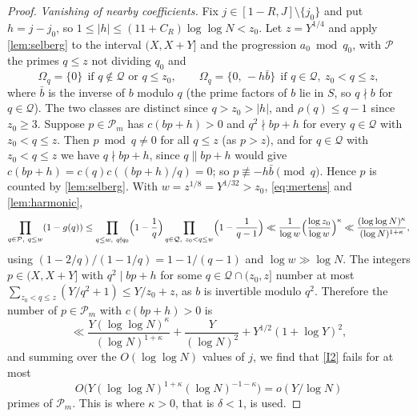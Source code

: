 \documentclass[11pt]{article}
\newcommand{\Qset}{\mathcal Q}
\newcommand{\Pset}{\mathcal P}
\begin{document}
\begin{proof}
\emph{Vanishing of nearby coefficients.} Fix $j\in[1-R,J]\setminus\{j_0\}$
and put $h=j-j_0$, so $1\le|h|\le(11+C_R)\log\log N<z_0$. Let $z=Y^{1/4}$ and
apply \cref{lem:selberg} to the interval $(X,X+Y]$ and the progression
$a_0\bmod q_0$, with $\Pset$ the primes $q\le z$ not dividing $q_0$ and
\[
\Omega_q=\{0\}\ \ \text{if }q\notin\Qset\text{ or }q\le z_0,\qquad
\Omega_q=\{0,\,-h\bar b\}\ \ \text{if }q\in\Qset,\ z_0<q\le z,
\]
where $\bar b$ is the inverse of $b$ modulo $q$ (the prime factors of $b$ lie in
$S$, so $q\nmid b$ for $q\in\Qset$). The two classes are distinct since
$q>z_0>|h|$, and $\rho(q)\le q-1$ since $z_0\ge3$. Suppose $p\in\Pset_m$ has
$c(bp+h)>0$ and $q^2\nmid bp+h$ for every $q\in\Qset$ with $z_0<q\le z$. Then
$p\bmod q\ne0$ for all $q\le z$ (as $p>z$), and for $q\in\Qset$ with
$z_0<q\le z$ we have $q\nmid bp+h$, since $q\parallel bp+h$ would give
$c(bp+h)=c(q)c((bp+h)/q)=0$; so $p\not\equiv-h\bar b\pmod q$. Hence $p$ is
counted by \cref{lem:selberg}. With $w=z^{1/8}=Y^{1/32}>z_0$, \eqref{eq:mertens}
and \cref{lem:harmonic},
\[
\prod_{q\in\Pset,\ q\le w}(1-g(q))\le
\prod_{q\le w,\ q\nmid q_0}\Bigl(1-\frac1q\Bigr)
\prod_{q\in\Qset,\ z_0<q\le w}\Bigl(1-\frac1{q-1}\Bigr)
\ll\frac1{\log w}\Bigl(\frac{\log z_0}{\log w}\Bigr)^{\kappa}
\ll\frac{(\log\log N)^\kappa}{(\log N)^{1+\kappa}},
\]
using $(1-2/q)/(1-1/q)=1-1/(q-1)$ and $\log w\gg\log N$. The integers
$p\in(X,X+Y]$ with $q^2\mid bp+h$ for some $q\in\Qset\cap(z_0,z]$ number at
most $\sum_{z_0<q\le z}(Y/q^2+1)\le Y/z_0+z$, as $b$ is invertible modulo
$q^2$. Therefore the number of $p\in\Pset_m$ with $c(bp+h)>0$ is
\[
\ll\frac{Y(\log\log N)^\kappa}{(\log N)^{1+\kappa}}+\frac{Y}{(\log N)^2}+Y^{1/2}(1+\log Y)^2,
\]
and summing over the $O(\log\log N)$ values of $j$, we find that \ref{I2}
fails for at most
\[
O\bigl(Y(\log\log N)^{1+\kappa}(\log N)^{-1-\kappa}\bigr)=o(Y/\log N)
\]
primes of $\Pset_m$. This is where $\kappa>0$, that is $\delta<1$, is used.


\end{proof}
\end{document}
